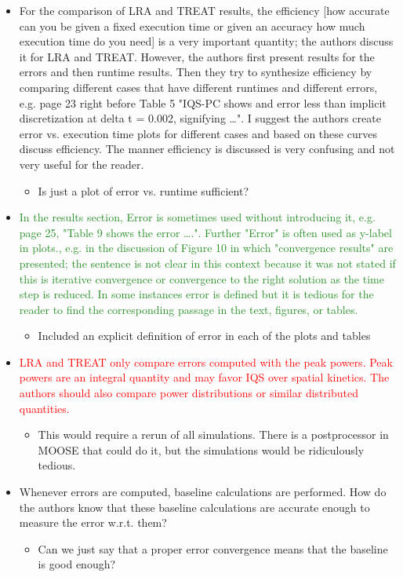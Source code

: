 \documentclass{elsarticle}
\newcommand{\fix}{\textsquare}
\newcommand{\done}{\checkmark}
\newcommand{\easy}[1]{\textcolor{ForestGreen}{#1}}
\newcommand{\medm}[1]{\textcolor{BurntOrange}{#1}}
\newcommand{\hard}[1]{\textcolor{Red}{#1}}
\begin{document}
\begin{itemize}
\item[\fix] \medm{ For the comparison of LRA and TREAT results, the efficiency [how accurate can you be given a fixed execution time or given an accuracy how much execution time do you need] is a very important quantity; the authors discuss it for LRA and TREAT. However, the authors first present results for the errors and then runtime results. Then they try to synthesize efficiency by comparing different cases that have different runtimes and different errors, e.g. page 23 right before Table 5 "IQS-PC shows and error less than implicit discretization at delta t = 0.002, signifying …". I suggest the authors create error vs. execution time plots for different cases and based on these curves discuss efficiency. The manner efficiency is discussed is very confusing and not very useful for the reader. }
\begin{itemize}
\item Is just a plot of error vs. runtime sufficient?
\end{itemize}

\item[\done] \easy{ In the results section, Error is sometimes used without introducing it, e.g. page 25, "Table 9 shows the error ….". Further "Error" is often used as y-label in plots., e.g. in the discussion of Figure 10 in which "convergence results" are presented; the sentence is not clear in this context because it was not stated if this is iterative convergence or convergence to the right solution as the time step is reduced. In some instances error is defined but it is tedious for the reader to find the corresponding passage in the text, figures, or tables. }
\begin{itemize}
\item Included an explicit definition of error in each of the plots and tables
\end{itemize}

\item[\fix] \hard{ LRA and TREAT only compare errors computed with the peak powers. Peak powers are an integral quantity and may favor IQS over spatial kinetics. The authors should also compare power distributions or similar distributed quantities. }
\begin{itemize}
\item This would require a rerun of all simulations. There is a postprocessor in MOOSE that could do it, but the simulations would be ridiculously tedious.
\end{itemize}

\item[\fix] \medm{  Whenever errors are computed, baseline calculations are performed. How do the authors know that these baseline calculations are accurate enough to measure the error w.r.t. them? }
\begin{itemize}
\item Can we just say that a proper error convergence means that the baseline is good enough?
\end{itemize}

\end{itemize}
\end{document}

